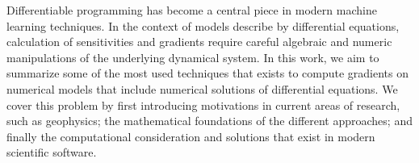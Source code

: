 Differentiable programming has become a central piece in modern machine learning techniques. 
In the context of models describe by differential equations, calculation of sensitivities and gradients require careful algebraic and numeric manipulations of the underlying dynamical system.
In this work, we aim to summarize some of the most used techniques that exists to compute gradients on numerical models that include numerical solutions of differential equations. 
We cover this problem by first introducing motivations in current areas of research, such as geophysics; the mathematical foundations of the different approaches; and finally the computational consideration and solutions that exist in modern scientific software. 